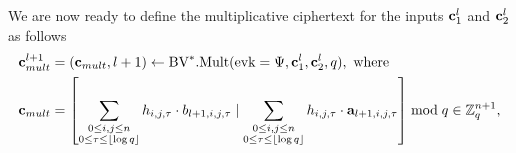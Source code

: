 \documentclass[../main.tex]{subfiles}
\begin{document}
We are now ready to define the multiplicative ciphertext for the inputs $\mathbf{c}_1^l$ and $\mathbf{c}_2^l$ as follows 
\begin{align}\label{eq:cmult}
    \mathbf{c}_{mult}^{l+1} &= (\mathbf{c}_{mult}, l+1) \leftarrow \text{BV}^*.\text{Mult}(\text{evk}=\Psi,\mathbf{c}_1^l, \mathbf{c}_2^l, q), \text{ where } \nonumber \\
    \mathbf{c}_{mult}&= \left[{\sum_{\substack{0 \le i,j \le n \\ 0 \le \tau \le \lfloor \log q \rfloor }} h_{i,j,\tau} \cdot b_{l+1,i,j,\tau} \mid \sum_{\substack{0 \le i,j \le n \\ 0 \le \tau \le \lfloor \log q \rfloor }} h_{i,j,\tau} \cdot \mathbf{a}_{l+1,i,j,\tau} }\right] \bmod q \in \mathbb{Z}_q^{n+1}, 
\end{align}
\end{document}
